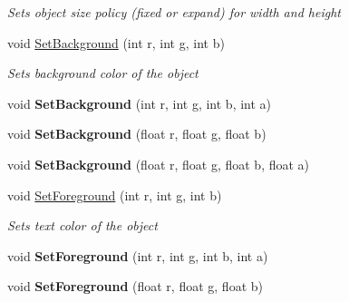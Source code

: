 \begin{DoxyCompactItemize}
\begin{DoxyCompactList}\small\item\em Sets object size policy (fixed or expand) for width and height \end{DoxyCompactList}\item 
void \mbox{\hyperlink{class_space_v_i_l_1_1_decorations_1_1_style_a3000086edf6f2c8ce452e615f356e98a}{Set\+Background}} (int r, int g, int b)
\begin{DoxyCompactList}\small\item\em Sets background color of the object \end{DoxyCompactList}\item 
\mbox{\label{class_space_v_i_l_1_1_decorations_1_1_style_adf87abebd4c9e231ec3a49a11db18f25}} 
void {\bfseries Set\+Background} (int r, int g, int b, int a)
\item 
\mbox{\label{class_space_v_i_l_1_1_decorations_1_1_style_af1ab3cb0c03e2efc0d2433cf14bd264a}} 
void {\bfseries Set\+Background} (float r, float g, float b)
\item 
\mbox{\label{class_space_v_i_l_1_1_decorations_1_1_style_a7e7af52d32e5d25800e02e9f7e77a36a}} 
void {\bfseries Set\+Background} (float r, float g, float b, float a)
\item 
void \mbox{\hyperlink{class_space_v_i_l_1_1_decorations_1_1_style_ade9e8c52d6afb916623df2b69a0182e9}{Set\+Foreground}} (int r, int g, int b)
\begin{DoxyCompactList}\small\item\em Sets text color of the object \end{DoxyCompactList}\item 
\mbox{\label{class_space_v_i_l_1_1_decorations_1_1_style_a1d777278b8943ab397f6fb14afd578eb}} 
void {\bfseries Set\+Foreground} (int r, int g, int b, int a)
\item 
\mbox{\label{class_space_v_i_l_1_1_decorations_1_1_style_a7300fed36f852eec776bb5cedbeefe14}} 
void {\bfseries Set\+Foreground} (float r, float g, float b)
\item 
\mbox{\label{class_space_v_i_l_1_1_decorations_1_1_style_a8ac66f71c802634cfa51cc96b20752b7}} 

\end{DoxyCompactItemize}
